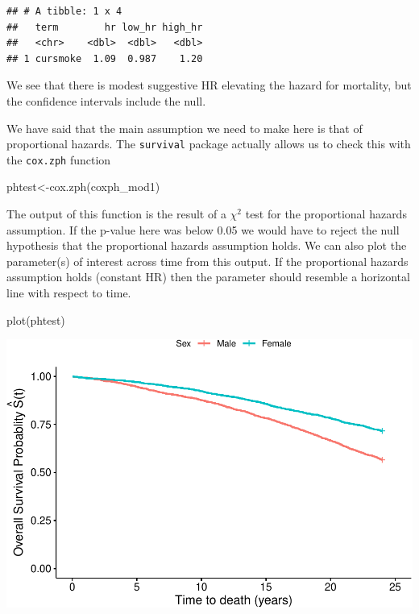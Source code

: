 \documentclass[
]{book}
\newenvironment{Shaded}{\begin{snugshade}}{\end{snugshade}}
\newcommand{\FunctionTok}[1]{\textcolor[rgb]{0.00,0.00,0.00}{#1}}
\newcommand{\NormalTok}[1]{#1}
\newcommand{\OtherTok}[1]{\textcolor[rgb]{0.56,0.35,0.01}{#1}}
\begin{document}
\begin{verbatim}
## # A tibble: 1 x 4
##   term        hr low_hr high_hr
##   <chr>    <dbl>  <dbl>   <dbl>
## 1 cursmoke  1.09  0.987    1.20
\end{verbatim}

We see that there is modest suggestive HR elevating the hazard for mortality, but the confidence intervals include the null.

We have said that the main assumption we need to make here is that of proportional hazards. The \texttt{survival} package actually allows us to check this with the \texttt{cox.zph} function

\begin{Shaded}
\begin{Highlighting}[]
\NormalTok{phtest}\OtherTok{\textless{}{-}}\FunctionTok{cox.zph}\NormalTok{(coxph\_mod1)}
\end{Highlighting}
\end{Shaded}

The output of this function is the result of a \(\chi^2\) test for the proportional hazards assumption. If the p-value here was below 0.05 we would have to reject the null hypothesis that the proportional hazards assumption holds.
We can also plot the parameter(s) of interest across time from this output. If the proportional hazards assumption holds (constant HR) then the parameter should resemble a horizontal line with respect to time.

\begin{Shaded}
\begin{Highlighting}[]
\FunctionTok{plot}\NormalTok{(phtest)}
\end{Highlighting}
\end{Shaded}

\includegraphics{adv_epi_analysis_files/figure-latex/unnamed-chunk-203-1.pdf}
\end{document}
